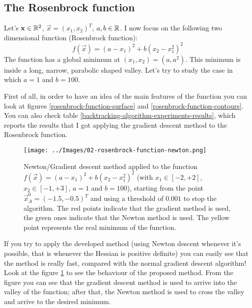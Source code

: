         \subsection{The Rosenbrock function}
            Let's \(\mathbf{x} \in \mathbb{R}^2\), \(\vec{x} = (x_1, x_2)^T\), \(a,b \in \mathbb{R}\). I now focus on the following two dimensional function (Rosenbrock function):
            \[f(\vec{x}) = (a - x_1)^2 + b(x_2 - x_1^2)^2\]
            The function has a global minimum at \((x_1, x_2) = (a, a^2)\). This minimum is inside a long, narrow, parabolic shaped valley. Let's try to study the case in which \(a=1\) and \(b=100\).\par
            First of all, in order to have an idea of the main features of the function you can look at figures \ref{rosenbrock-function-surface} and \ref{rosenbrock-function-contours}. You can also check table \ref{backtracking-algorithm-experiments-results}, which reports the results that I got applying the gradient descent method to the Rosenbrock function.
            \begin{figure}
                \centering
                \texttt{[image: ../Images/02-rosenbrock-function-newton.png]}
                \caption{Newton/Gradient descent method applied to the function \(f(\vec{x}) = (a - x_1)^2 + b(x_2 - x_1^2)^2\) (with \(x_1 \in [-2, +2]\), \(x_2 \in [-1, +3]\), \(a=1\) and \(b=100\)), starting from the point \(\vec{x}_A^0 = (-1.5,-0.5)^T\) and using a threshold of \(0.001\) to stop the algorithm. The red points indicate that the gradient method is used, the green ones indicate that the Newton method is used. The yellow point represents the real minimum of the function.}
                \label{rosenbrock-function-newton}
            \end{figure}
            If you try to apply the developed method (using Newton descent whenever it's possible, that is whenever the Hessian is positive definite) you can easily see that the method is really fast, compared with the normal gradient descent algorithm! Look at the figure \ref{rosenbrock-function-newton} to see the behaviour of the proposed method. From the figure you can see that the gradient descent method is used to arrive into the valley of the function; after that, the Newton method is used to cross the valley and arrive to the desired minimum.
